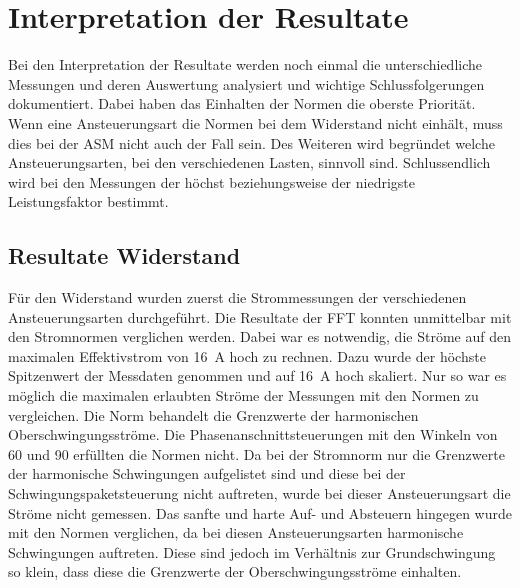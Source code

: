\section{Interpretation der Resultate}\label{sec:Interpretation_Resultate}
Bei den Interpretation der Resultate werden noch einmal die unterschiedliche Messungen und deren Auswertung analysiert und wichtige Schlussfolgerungen dokumentiert. Dabei haben das Einhalten der Normen die oberste Priorität. Wenn eine Ansteuerungsart die Normen bei dem Widerstand nicht einhält, muss dies bei der ASM nicht auch der Fall sein. Des Weiteren wird begründet welche Ansteuerungsarten, bei den verschiedenen Lasten, sinnvoll sind. Schlussendlich wird bei den Messungen der höchst beziehungsweise der niedrigste Leistungsfaktor bestimmt.


\subsection{Resultate Widerstand}
Für den Widerstand wurden zuerst die Strommessungen der verschiedenen Ansteuerungsarten durchgeführt. Die Resultate der FFT konnten unmittelbar mit den Stromnormen  verglichen werden. Dabei war es notwendig, die Ströme auf den maximalen Effektivstrom von \SI{16}{A} hoch zu rechnen. Dazu wurde der höchste Spitzenwert der Messdaten genommen und auf \SI{16}{A} hoch skaliert. Nur so war es möglich die maximalen erlaubten Ströme der Messungen mit den Normen zu vergleichen. Die Norm behandelt die Grenzwerte der harmonischen Oberschwingungsströme. Die Phasenanschnittsteuerungen mit den Winkeln von 60\textdegree \hspace{0.02cm} und 90\textdegree \hspace{0.02cm} erfüllten die Normen nicht. Da bei der Stromnorm nur die Grenzwerte der harmonische Schwingungen aufgelistet sind und diese bei der Schwingungspaketsteuerung nicht auftreten, wurde bei dieser Ansteuerungsart die Ströme nicht gemessen. Das sanfte und harte Auf- und Absteuern hingegen wurde mit den Normen verglichen, da bei diesen Ansteuerungsarten harmonische Schwingungen auftreten. Diese sind jedoch im Verhältnis zur Grundschwingung so klein, dass diese die Grenzwerte der Oberschwingungsströme einhalten. 

